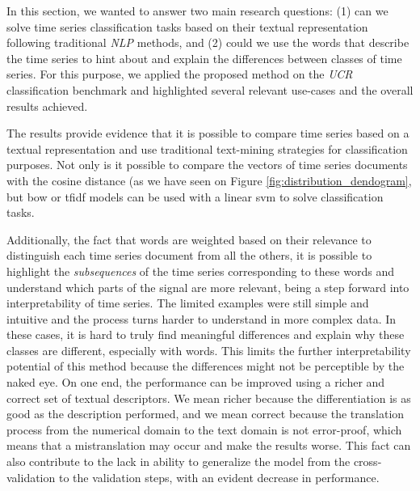 In this section, we wanted to answer two main research questions: (1) can we solve time series classification tasks based on their textual representation following traditional \textit{NLP} methods, and (2) could we use the words that describe the time series to hint about and explain the differences between classes of time series. For this purpose, we applied the proposed method on the \textit{UCR} classification benchmark and highlighted several relevant use-cases and the overall results achieved.
\par
The results provide evidence that it is possible to compare time series based on a textual representation and use traditional text-mining strategies for classification purposes. Not only is it possible to compare the vectors of time series documents with the cosine distance (as we have seen on Figure \ref{fig:distribution_dendogram}, but \gls{bow} or \gls{tfidf} models can be used with a linear \gls{svm} to solve classification tasks.
\par
Additionally, the fact that words are weighted based on their relevance to distinguish each time series document from all the others, it is possible to highlight the \textit{subsequences} of the time series corresponding to these words and understand which parts of the signal are more relevant, being a step forward into interpretability of time series. The limited examples were still simple and intuitive and the process turns harder to understand in more complex data. In these cases, it is hard to truly find meaningful differences and explain why these classes are different, especially with words. This limits the further interpretability potential of this method because the differences might not be perceptible by the naked eye. On one end, the performance can be improved using a richer and correct set of textual descriptors. We mean richer because the differentiation is as good as the description performed, and we mean correct because the translation process from the numerical domain to the text domain is not error-proof, which means that a mistranslation may occur and make the results worse. This fact can also contribute to the lack in ability to generalize the model from the cross-validation to the validation steps, with an evident decrease in performance.

